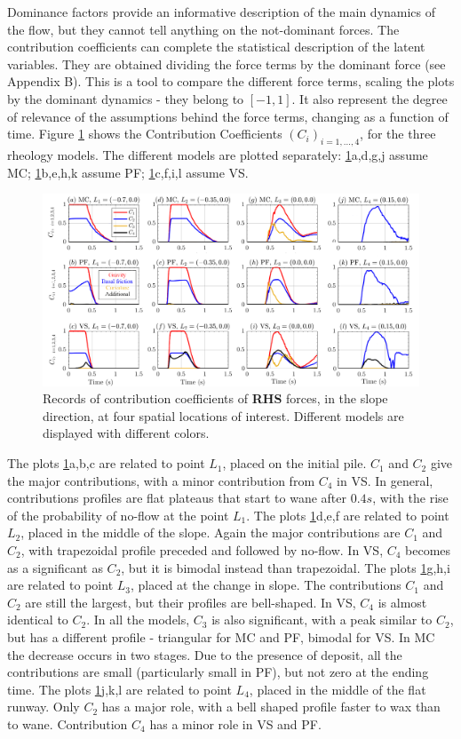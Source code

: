 \documentclass{article}
\begin{document}
Dominance factors provide an informative description of the main dynamics of the flow, but they cannot tell anything on the not-dominant forces. The contribution coefficients can complete the statistical description of the latent variables. They are obtained dividing the force terms by the dominant force (see Appendix B). This is a tool to compare the different force terms, scaling the plots by the dominant dynamics - they belong to $[-1,1]$. It also represent the degree of relevance of the assumptions behind the force terms, changing as a function of time. Figure \ref{fig:Ramp-Ci_x} shows the Contribution Coefficients $(C_i)_{i=1,\dots,4}$, for the three rheology models. The different models are plotted separately: \ref{fig:Ramp-Ci_x}a,d,g,j assume MC; \ref{fig:Ramp-Ci_x}b,e,h,k assume PF; \ref{fig:Ramp-Ci_x}c,f,i,l assume VS.
\begin{figure}[H]
         \centering
        \includegraphics[width=1\textwidth]{InclinedPlane/ForceContrib/Ci_x.png}
        \caption{Records of contribution coefficients of \textbf{RHS} forces, in the slope direction, at four spatial locations of interest. Different models are displayed with different colors.}
        \label{fig:Ramp-Ci_x}
\end{figure}
The plots \ref{fig:Ramp-Ci_x}a,b,c are related to point $L_1$, placed on the initial pile. $C_1$ and $C_2$ give the major contributions, with a minor contribution from $C_4$ in VS. In general, contributions profiles are flat plateaus that start to wane after $0.4 s$, with the rise of the probability of no-flow at the point $L_1$. The plots \ref{fig:Ramp-Ci_x}d,e,f are related to point $L_2$, placed in the middle of the slope. Again the major contributions are $C_1$ and $C_2$, with trapezoidal profile preceded and followed by no-flow. In VS, $C_4$ becomes as a significant as $C_2$, but it is bimodal instead than trapezoidal. The plots \ref{fig:Ramp-Ci_x}g,h,i are related to point $L_3$, placed at the change in slope. The contributions $C_1$ and $C_2$ are still the largest, but their profiles are bell-shaped. In VS, $C_4$ is almost identical to $C_2$. In all the models, $C_3$ is also significant, with a peak similar to $C_2$, but has a different profile - triangular for MC and PF, bimodal for VS. In MC the decrease occurs in two stages. Due to the presence of deposit, all the contributions are small (particularly small in PF), but not zero at the ending time. The plots \ref{fig:Ramp-Ci_x}j,k,l are related to point $L_4$, placed in the middle of the flat runway. Only $C_2$ has a major role, with a bell shaped profile faster to wax than to wane. Contribution $C_4$ has a minor role in VS and PF.
\newpage
\end{document}
